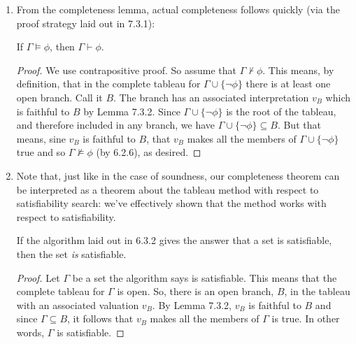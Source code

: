 \begin{enumerate}[\thesection.1]
\begin{proof}
\begin{enumerate}[(i)]
\begin{enumerate}[(a)]
		\end{enumerate}
	
	\end{enumerate}
			As we said above, the remaining cases are left as exercises. Once they are completed, we can infer the completeness lemma via induction.
	\end{proof}

	\item From the completeness lemma, actual completeness follows quickly (via the proof strategy laid out in 7.3.1):
	\begin{theorem}
	If $\Gamma\vDash\phi$, then $\Gamma\vdash\phi$.
	\end{theorem}
	
	\begin{proof}
	We use contrapositive proof. So assume that $\Gamma\nvdash\phi$. This means, by definition, that in the complete tableau for $\Gamma\cup\{\neg\phi\}$ there is at least one open branch. Call it $B$. The branch has an associated interpretation $v_B$ which is faithful to $B$ by Lemma 7.3.2. Since $\Gamma\cup\{\neg\phi\}$ is the root of the tableau, and therefore included in any branch, we have $\Gamma\cup\{\neg\phi\}\subseteq B$. But that means, sine $v_B$  is faithful to $B$, that $v_B$ makes all the members of $\Gamma\cup\{\neg\phi\}$ true and so $\Gamma\nvDash\phi$ (by 6.2.6), as desired.
	\end{proof}
	
	\item Note that, just like in the case of soundness, our completeness theorem can be interpreted as a theorem about the tableau method with respect to satisfiability search: we've effectively shown that the method works with respect to satisfiability.

	\begin{theorem} If the algorithm laid out in 6.3.2 gives the answer that a set is satisfiable, then the set \emph{is} satisfiable.
	\end{theorem}
	\begin{proof}
	Let $\Gamma$ be a set the algorithm says is satisfiable. This means that the complete tableau for $\Gamma$ is open. So, there is an open branch, $B$, in the tableau with an associated valuation $v_B$. By Lemma 7.3.2, $v_B$ is faithful to $B$ and since $\Gamma\subseteq B$, it follows that $v_B$ makes all the members of $\Gamma$ is true. In other words, $\Gamma$ is satisfiable.
	\end{proof}
	

\end{enumerate}
